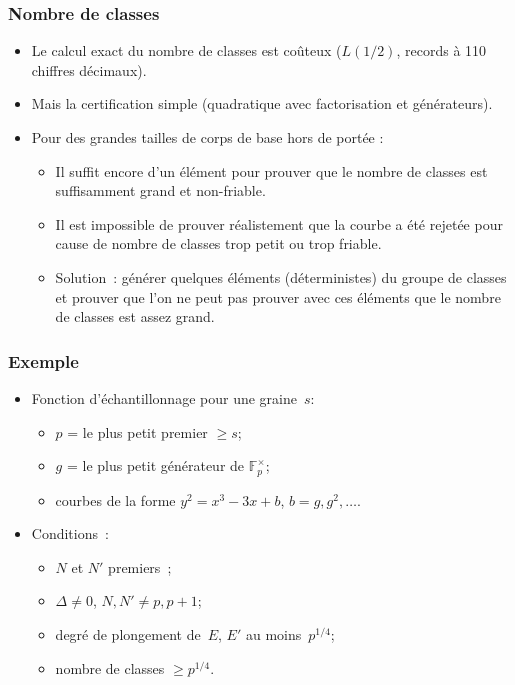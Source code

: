 \documentclass[francais]{beamer}
\newcommand{\F}{\mathbb{F}}
\begin{document}
\begin{frame}\frametitle{Nombre de classes}
\begin{itemize}
\item Le calcul exact du nombre de classes est
coûteux
($L(1/2)$, records à 110 chiffres décimaux).
\item Mais la certification simple (quadratique avec factorisation et générateurs).
\item Pour des grandes tailles de corps de base hors de portée :
\begin{itemize}
\item Il suffit encore d'un élément pour prouver que le nombre de classes est
suffisamment grand et non-friable.
\item Il est impossible de prouver réalistement que la courbe
a été rejetée pour cause de nombre de classes trop petit ou trop friable.
\item Solution : générer quelques éléments (déterministes) du groupe de classes
et prouver que l'on ne peut pas prouver avec ces éléments
que le nombre de classes est assez grand.
\end{itemize}
\end{itemize}
\end{frame}

\begin{frame}\frametitle{Exemple}
\begin{itemize}
\item Fonction d'échantillonnage pour une graine~$s$:
\begin{itemize}
\item $p$ = le plus petit premier $≥ s$;
\item $g$ = le plus petit générateur de $\F_p^{×}$;
\item courbes de la forme $y^2 = x^3 - 3x + b$, $b = g, g^2, …$.
\end{itemize}
\bigskip
\item Conditions :
\begin{itemize}
\item $N$ et $N'$ premiers ;
\item $Δ ≠ 0$, $N, N' ≠ p, p + 1$;
\item degré de plongement de~$E$, $E'$ au moins~$p^{1/4}$;
\item nombre de classes $≥ p^{1/4}$.
\end{itemize}
\end{itemize}
\end{frame}
\end{document}
